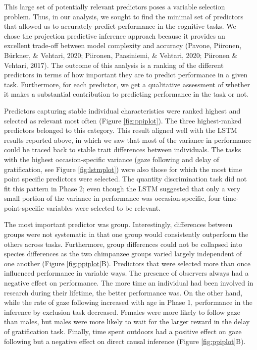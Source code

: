 \documentclass[
  man,floatsintext]{apa6}
\begin{document}
This large set of potentially relevant predictors poses a variable selection problem. Thus, in our analysis, we sought to find the minimal set of predictors that allowed us to accurately predict performance in the cognitive tasks. We chose the projection predictive inference approach because it provides an excellent trade-off between model complexity and accuracy (Pavone, Piironen, Bürkner, \& Vehtari, 2020; Piironen, Paasiniemi, \& Vehtari, 2020; Piironen \& Vehtari, 2017). The outcome of this analysis is a ranking of the different predictors in terms of how important they are to predict performance in a given task. Furthermore, for each predictor, we get a qualitative assessment of whether it makes a substantial contribution to predicting performance in the task or not.

Predictors capturing stable individual characteristics were ranked highest and selected as relevant most often (Figure \ref{fig:ppiplot}). The three highest-ranked predictors belonged to this category. This result aligned well with the LSTM results reported above, in which we saw that most of the variance in performance could be traced back to stable trait differences between individuals. The tasks with the highest occasion-specific variance (gaze following and delay of gratification, see Figure \ref{fig:lstmplot}) were also those for which the most time point specific predictors were selected. The quantity discrimination task did not fit this pattern in Phase 2; even though the LSTM suggested that only a very small portion of the variance in performance was occasion-specific, four time-point-specific variables were selected to be relevant.

The most important predictor was group. Interestingly, differences between groups were not systematic in that one group would consistently outperform the others across tasks. Furthermore, group differences could not be collapsed into species differences as the two chimpanzee groups varied largely independent of one another (Figure \ref{fig:ppiplot}B). Predictors that were selected more than once influenced performance in variable ways. The presence of observers always had a negative effect on performance. The more time an individual had been involved in research during their lifetime, the better performance was. On the other hand, while the rate of gaze following increased with age in Phase 1, performance in the inference by exclusion task decreased. Females were more likely to follow gaze than males, but males were more likely to wait for the larger reward in the delay of gratification task. Finally, time spent outdoors had a positive effect on gaze following but a negative effect on direct causal inference (Figure \ref{fig:ppiplot}B).
\end{document}
